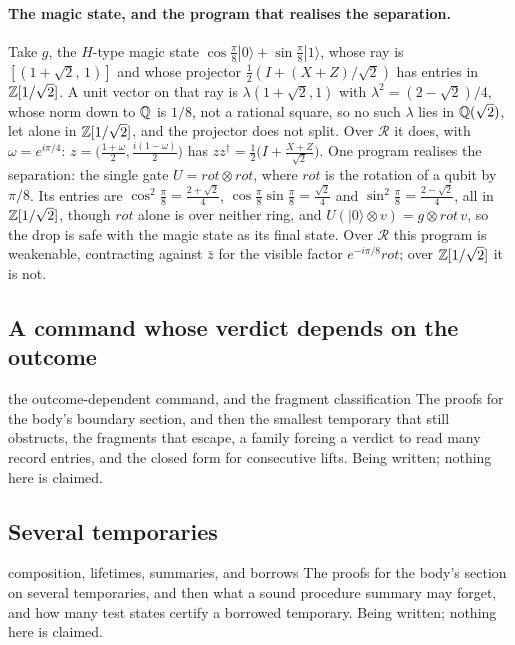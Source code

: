 \documentclass[acmsmall,screen,review,anonymous,nonacm]{acmart}
\begin{document}
\paragraph{The magic state, and the program that realises the separation.}
Take $g$, the $H$-type magic state $\cos\tfrac{\pi}{8}|0\rangle +
\sin\tfrac{\pi}{8}|1\rangle$, whose ray is $[(1+\sqrt2,\,1)]$ and whose
projector $\tfrac12(I + (X+Z)/\sqrt2)$ has entries in $\mathbb{Z}[1/\sqrt2]$. A unit
vector on that ray is $\lambda(1+\sqrt2, 1)$ with $\lambda^{2} =
(2-\sqrt2)/4$, whose norm down to $\mathbb{Q}$ is $1/8$, not a rational square, so no
such $\lambda$ lies in $\mathbb{Q}(\sqrt2)$, let alone in $\mathbb{Z}[1/\sqrt2]$, and the
projector does not split. Over $\mathcal R$ it does, with $\omega =
e^{i\pi/4}$: $z = \bigl(\tfrac{1+\omega}{2}, \tfrac{i(1-\omega)}{2}\bigr)$ has
$zz^{\dagger} = \tfrac12\bigl(I + \tfrac{X+Z}{\sqrt2}\bigr)$. One program
realises the separation: the single gate $U = \mathit{rot} \otimes
\mathit{rot}$, where $\mathit{rot}$ is the rotation of a qubit by $\pi/8$. Its
entries are $\cos^{2}\tfrac\pi8 = \tfrac{2+\sqrt2}{4}$, $\cos\tfrac\pi8
\sin\tfrac\pi8 = \tfrac{\sqrt2}{4}$ and $\sin^{2}\tfrac\pi8 =
\tfrac{2-\sqrt2}{4}$, all in $\mathbb{Z}[1/\sqrt2]$, though $\mathit{rot}$ alone is
over neither ring, and $U(|0\rangle \otimes v) = g \otimes \mathit{rot}\,v$,
so the drop is safe with the magic state as its final state. Over $\mathcal R$
this program is weakenable, contracting against $\bar z$ for the visible
factor $e^{-i\pi/8}\mathit{rot}$; over $\mathbb{Z}[1/\sqrt2]$ it is not.

\subsection{A command whose verdict depends on the outcome}\label{app:outcome}

\begin{planned}{the outcome-dependent command, and the fragment classification}
The proofs for the body's boundary section, and then the smallest temporary
that still obstructs, the fragments that escape, a family forcing a verdict to
read many record entries, and the closed form for consecutive lifts. Being
written; nothing here is claimed.
\end{planned}

\subsection{Several temporaries}\label{app:many}

\begin{planned}{composition, lifetimes, summaries, and borrows}
The proofs for the body's section on several temporaries, and then what a sound
procedure summary may forget, and how many test states certify a borrowed
temporary. Being written; nothing here is claimed.
\end{planned}
\end{document}
